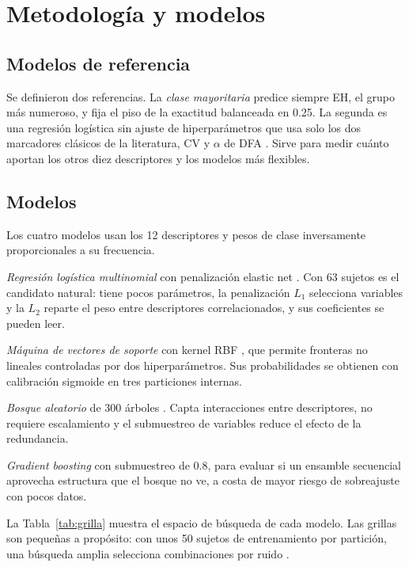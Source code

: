\documentclass[conference]{IEEEtran}
\begin{document}
\section{Metodología y modelos}

\subsection{Modelos de referencia}
Se definieron dos referencias. La \textit{clase mayoritaria} predice siempre EH, el grupo más numeroso, y fija el piso de la exactitud balanceada en 0.25. La segunda es una regresión logística sin ajuste de hiperparámetros que usa solo los dos marcadores clásicos de la literatura, CV y $\alpha$ de DFA \cite{hausdorff1997,hausdorff2000}. Sirve para medir cuánto aportan los otros diez descriptores y los modelos más flexibles.

\subsection{Modelos}
Los cuatro modelos usan los 12 descriptores y pesos de clase inversamente proporcionales a su frecuencia.

\textit{Regresión logística multinomial} con penalización elastic net \cite{zou2005}. Con 63 sujetos es el candidato natural: tiene pocos parámetros, la penalización $L_1$ selecciona variables y la $L_2$ reparte el peso entre descriptores correlacionados, y sus coeficientes se pueden leer.

\textit{Máquina de vectores de soporte} con kernel RBF \cite{cortes1995}, que permite fronteras no lineales controladas por dos hiperparámetros. Sus probabilidades se obtienen con calibración sigmoide \cite{platt1999} en tres particiones internas.

\textit{Bosque aleatorio} de 300 árboles \cite{breiman2001}. Capta interacciones entre descriptores, no requiere escalamiento y el submuestreo de variables reduce el efecto de la redundancia.

\textit{Gradient boosting} \cite{friedman2001} con submuestreo de 0.8, para evaluar si un ensamble secuencial aprovecha estructura que el bosque no ve, a costa de mayor riesgo de sobreajuste con pocos datos.

La Tabla~\ref{tab:grilla} muestra el espacio de búsqueda de cada modelo. Las grillas son pequeñas a propósito: con unos 50 sujetos de entrenamiento por partición, una búsqueda amplia selecciona combinaciones por ruido \cite{cawley2010}.
\end{document}
